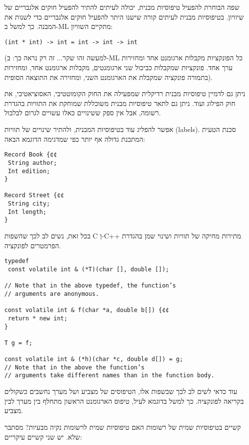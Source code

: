       שפה הבוחרת להפעיל טיפוסיות מבנית, יכולה לעיתים להתיר להפעיל חוקים אלגבריים של שיוויון. בטיפוסיות מבנית לעיתים קורה שישנו היתר להפעיל חוקים אלגבריים כדי לשנות את המבנה. כך למשל ב-ML מתקיים השוויון:

\begin{verbatim}
(int * int) -> int = int -> int -> int
\end{verbatim}

      (למעשה זהו שקר... זה רק נראה כך: ב-ML כל הפונקציות מקבלות ארגומנט אחד ומחזירות ערך אחד. פונקציות שמקבלות כביכול שני ארגומנטים, מקבלות ארגומנט אחד, ומחזירות בתמורה פונקציה שמקבלת את הארגומנט השני, ומחזירה את התוצאה הסופית).

      ניתן גם לדמיין טיפוסיות מבנית רדיקלית שמפעילה את החוק הקומוטטיבי, האסוציאטיבי, את חוק הפילוג ועוד. ניתן גם לתאר טיפוסיות מבנית משוכללת שמוחקת את התוויות בהגדרת רשומה, אבל אין ספק ששינויים כאלו עשויים לגרום לבלבול.

      אפשר להפליג עוד בטיפוסיות המבנית, ולהתיר שינויים של תוויות (labels). סכנת הטעית המתכנת גדולה אף יותר כפי שמדגימה הדוגמא הבאה:

\begin{verbatim}
Record Book {¢¢
 String author;
 Int edition;
}

Record Street {¢¢
 String city;
 Int length;
}
\end{verbatim}

      בכל זאת, נשים לב לכך שהשפות C וְ-C++ מתירות מחיקה של תוויות ושינוי שמן בהגדרת הפרמטרים לפונקציה.

\begin{verbatim}
typedef
 const volatile int & (*T)(char [], double []);

// Note that in the above typedef, the function’s
// arguments are anonymous.

const volatile int & f(char *a, double b[]) {¢¢
 return * new int;
}

T g = f;

const volatile int & (*h)(char *c, double d[]) = g;
// Note that in the above the function’s
// arguments take different names than in the function body.

\end{verbatim}

      עוד כדאי לשים לב לכך שבשפות אלו, הטיפוסים של מצביע ושל מערך נחשבים כשקולים
      בקריאה לפונקציה. כך למשל בדוגמא לעיל, טיפוס הארגומנט הראשון מתחלף בין מערך לבין
      מצביע.

      קשיים בטיפוסיות שמית של רשומות האם טיפוסיות שמית לרשומות נקיה מבעיות? מסתבר
      שלא. יש שני קשיים עיקריים:

